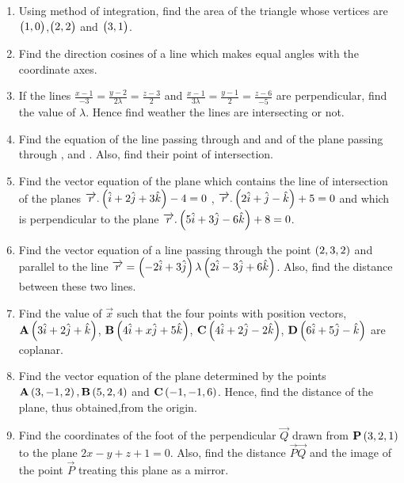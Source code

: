 \begin{enumerate}
 \item Using method of integration, find the area of the triangle whose vertices are $\begin{pmatrix}1,0\end{pmatrix}$,$\begin{pmatrix}2,2\end{pmatrix}$ and $\begin{pmatrix}3,1\end{pmatrix}$.
 
 \item Find the direction cosines of a line which makes equal angles with the coordinate axes.
         
 \item If the lines $\frac{x-1}{-3}=\frac{y-2}{2\lambda}=\frac{z-3}{2}$ and $\frac{x-1}{3\lambda}=\frac{y-1}{2}=\frac{z-6}{-5}$ are perpendicular, find the value of $\lambda$. Hence find weather the lines are intersecting or not.
           
\item Find the equation of the line passing through  and  and of the plane passing through ,  and . Also, find their point of intersection.
\item Find the vector equation of the plane which contains the line of intersection of the planes 
$ \overrightarrow{r}.\left(\hat{i} + 2\hat{j}+3\hat{k}\right)-4=0$ , $\overrightarrow{r}.
\left(2\hat{i} + \hat{j} - \hat{k}\right)+5=0$ and which is perpendicular to the plane $\overrightarrow{r}.\left(5\hat{i} + 3\hat{j} - 6\hat{k}\right)+8=0$.

\item Find the vector equation of a line passing through the point
$\left(2, 3, 2\right)$ and parallel to the line $\overrightarrow{r}=\left(-2\hat{i} +3\hat{j}\right)\lambda\left(2\hat{i} - 3\hat{j}+6\hat{k}\right)$.
Also, find the distance between these two lines.

\item Find the value of $\vec{x}$ such that the four points with position vectors,
$\mathbf{A}\left(3\hat{i} + 2\hat{j} + \hat{k}\right)$, $\mathbf{B}\left(4\hat{i} + x\hat{j} + 5\hat{k}\right)$, $\mathbf{C}\left(4\hat{i} + 2\hat{j} -2 \hat{k}\right)$, $\mathbf{D}\left(6\hat{i} + 5\hat{j} - \hat{k}\right)$ are coplanar.

\item Find the vector equation of the plane determined by the points $\mathbf{A}\left(3, -1, 2\right), \mathbf{B}\left(5, 2, 4\right)$ and $\mathbf{C}\left(-1, -1, 6\right)$. Hence, find the distance of the plane, thus obtained,from the origin.

\item Find the coordinates of the foot of the perpendicular $\vec{Q}$ drawn from $\mathbf{P}\left(3, 2, 1\right)$ to the plane $2x - y + z + 1 = 0$. Also, find the distance $\vec{P}\vec{Q}$ and the image of the point $\vec{P}$ treating this plane as a mirror.
 \end{enumerate}
